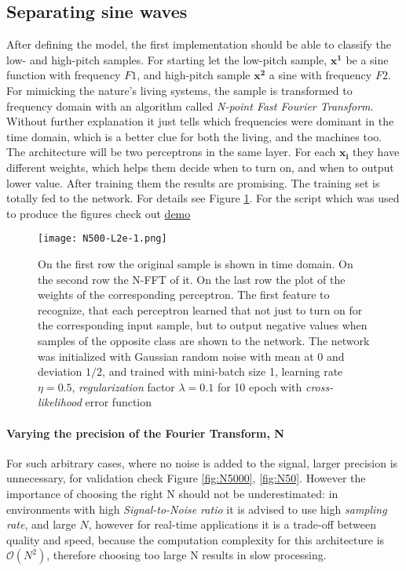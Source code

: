 \subsection{Separating sine waves}
After defining the model, the first implementation should be able to classify the low- and high-pitch samples. For starting let the low-pitch sample, $\mathbf{x^1}$ be a sine function with frequency $F1$, and high-pitch sample $\mathbf{x^2}$ a sine with frequency $F2$. For mimicking the nature's living systems, the sample is transformed to frequency domain with an algorithm called \emph{N-point Fast Fourier Transform}. Without further explanation it just tells which frequencies were dominant in the time domain, which is a better clue for both the living, and the machines too. The architecture will be two perceptrons in the same layer. For each $\mathbf{x_i}$ they have different weights, which helps them decide when to turn on, and when to output lower value. After training them the results are promising. The training set is totally fed to the network. For details see Figure \ref{fig:N500}. For the script which was used to produce the figures check out \href{https://github.com/botcs/deepvision/tree/master/demo/audio}{demo}

\begin{figure}
	\centering
	\texttt{[image: N500-L2e-1.png]}
	\caption{On the first row the original sample is shown in time domain. On the second row the N-FFT of it. On the last row the plot of the weights of the corresponding perceptron. The first feature to recognize, that each perceptron learned that not just to turn on for the corresponding input sample, but to output negative values when samples of the opposite class are shown to the network. The network was initialized with Gaussian random noise with mean at 0 and deviation $1/2$, and trained with mini-batch size 1, learning rate $\eta=0.5$, \emph{regularization} factor $\lambda=0.1$ for 10 epoch with \emph{cross-likelihood} error function}
	
	\label{fig:N500}
\end{figure}

\paragraph{Varying the precision of the Fourier Transform, N}
For such arbitrary cases, where no noise is added to the signal, larger precision is unnecessary, for validation check Figure \ref{fig:N5000}, \ref{fig:N50}. However the importance of choosing the right N should not be underestimated: in environments with high \emph{Signal-to-Noise ratio} it is advised to use high \emph{sampling rate}, and large $N$, however for real-time applications it is a trade-off between quality and speed, because the computation complexity for this architecture is $\mathcal{O}(N^2)$, therefore choosing too large N results in slow processing.

